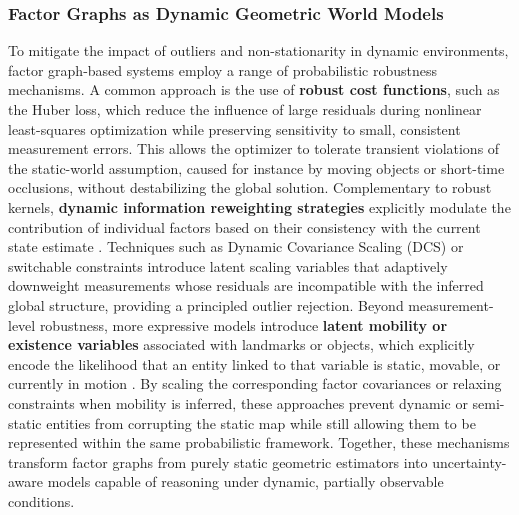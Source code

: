 \subsubsection{Factor Graphs as Dynamic Geometric World Models}\label{sec:dyn_world_model_representations_factor_graphs}
To mitigate the impact of outliers and non-stationarity in dynamic environments, factor graph-based systems employ a range of probabilistic robustness mechanisms.
A common approach is the use of \textbf{robust cost functions}, such as the Huber loss, which reduce the influence of large residuals during nonlinear least-squares optimization while preserving sensitivity to small, consistent measurement errors\cite{song_rts-slam_2025}. 
This allows the optimizer to tolerate transient violations of the static-world assumption, caused for instance by moving objects or short-time occlusions, without destabilizing the global solution.
Complementary to robust kernels, \textbf{dynamic information reweighting strategies} explicitly modulate the contribution of individual factors based on their consistency with the current state estimate \cite{lingzhu_xiang_robust_2015}. 
Techniques such as Dynamic Covariance Scaling (DCS) or switchable constraints introduce latent scaling variables that adaptively downweight measurements whose residuals are incompatible with the inferred global structure, providing a principled outlier rejection.
Beyond measurement-level robustness, more expressive models introduce \textbf{latent mobility or existence variables} associated with landmarks or objects, which explicitly encode the likelihood that an entity linked to that variable is static, movable, or currently in motion \cite{lingzhu_xiang_robust_2015}.
By scaling the corresponding factor covariances or relaxing constraints when mobility is inferred, these approaches prevent dynamic or semi-static entities from corrupting the static map while still allowing them to be represented within the same probabilistic framework.
Together, these mechanisms transform factor graphs from purely static geometric estimators into uncertainty-aware models capable of reasoning under dynamic, partially observable conditions.
